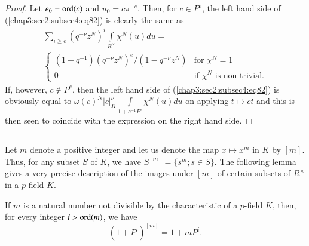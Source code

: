 \begin{proof}
  Let $e_{0}=\operatorname{ord}(c)$ and $u_{0}=c\pi^{-e}$. Then, for $c\in P^{e}$, the
  left hand side of (\ref{chap3:sec2:subsec4:eq82}) is clearly the same as
  \begin{multline*}
  \sum_{i\geq e}(q^{-\nu}z^{N})^{i}\int\limits_{R^{\times}}\chi^{N}(u)du=\\
  \begin{cases}
    (1-q^{-1})(q^{-\nu}z^{N})^{e}/(1-q^{-\nu}z^{N}) & \text{for }
    \chi^{N}=1\\
    0 & \text{if } \chi^{N} \text{ is non-trivial.}
  \end{cases}
  \end{multline*}
If, however, $c\not\in P^{e}$, then the left hand side of
(\ref{chap3:sec2:subsec4:eq82}) 
is obviously equal to
$\omega(c)^{N}|c|^{\nu}_{K}\int\limits_{1+c^{-1}P^{e}}\chi^{N}(u)du$
on applying $t\mapsto ct$ and this is then seen to coincide with the
expression on the right hand side.
\end{proof}

\subsection{}\label{chap3:sec2:subsec5}%

Let $m$ denote a positive integer and let us denote the map $x\mapsto
x^{m}$ in $K$ by $[m]$. Thus, for any subset $S$ of $K$, we have
$S^{[m]}=\{s^{m};s\in S\}$. The following lemma gives a very precise
description of the images under $[m]$ of certain subsets of $R^{\times}$
in a $p$-field $K$.

\begin{lemma}\label{chap3:sec2:subsec5:lem5} %
  If $m$ is a natural number not divisible by the characteristic of a
  $p$-field $K$, then, for every integer $i>\operatorname{ord}(m)$, we have
  $$
  (1+P^{i})^{[m]}=1+mP^{i}.
  $$
\end{lemma}

